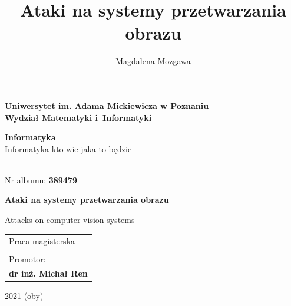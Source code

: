 \documentclass[12pt,a4paper,leqno,oneside,titlepage]{book}
\author{Magdalena Mozgawa}
\title{Ataki na systemy przetwarzania obrazu}
\begin{document}
\begin{titlepage}
\let\footnotesize\small
\let\footnoterule\relax
\let \footnote \thanks

\begin{center}
{\large \bf Uniwersytet im. Adama Mickiewicza w Poznaniu \\ Wydział Matematyki i~Informatyki \par}
\vspace{0.5cm plus 1mm minus 2mm}
{{\bf Informatyka} \\%
\small Informatyka kto wie jaka to będzie\par}%
\end{center}%

\vspace{1.5cm plus 1fill}
\begin{flushleft}
{ \\ \normalsize Nr albumu: \bf 389479\par}%
\end{flushleft}
\vspace{1.5cm plus 1mm minus 2mm}

\begin{center}
{\huge\textbf{Ataki na systemy przetwarzania obrazu}\par}%
\vspace{0.5cm plus 1mm minus 2mm}
{\large Attacks on computer vision systems}%
\par
\vspace{1.5cm plus 1.5fill}

\begin{flushright}\large
\begin{tabular}{l}
Praca magisterska\\[3pt]
\MakeUppercase{ }\\[3pt]
Promotor: \\[3pt]
\bfseries dr inż. Michał Ren \\[3pt]
\end{tabular}
\end{flushright}
\vspace{4cm plus .1fill}
{\large 2021 (oby)\par}%
\end{center}
\end{titlepage}
\end{document}
